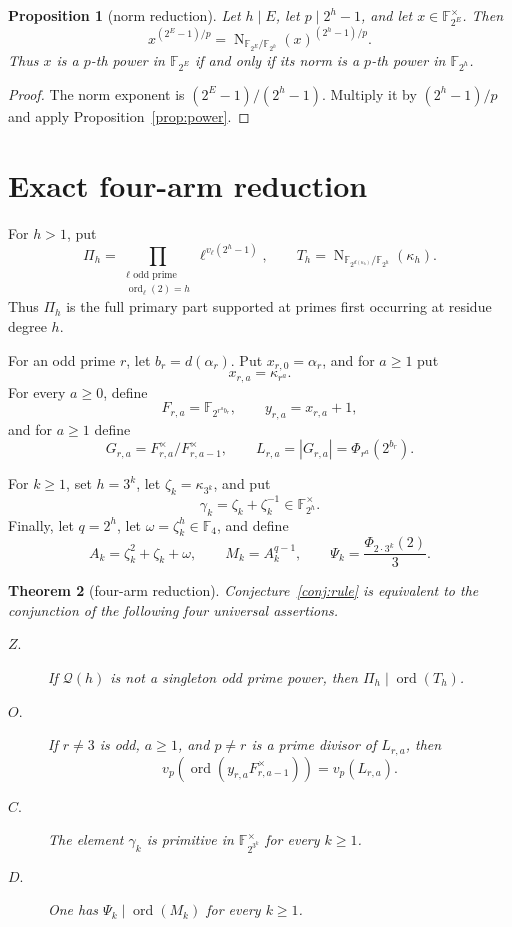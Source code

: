 \documentclass[11pt]{article}
\newtheorem{theorem}{Theorem}[section]
\newtheorem{proposition}[theorem]{Proposition}
\theoremstyle{definition}
\theoremstyle{remark}
\begin{document}
\begin{proposition}[norm reduction]\label{prop:norm}
Let $h\mid E$, let $p\mid2^h-1$, and let
$x\in\mathbb F_{2^E}^{\times}$.  Then
\[
 x^{(2^E-1)/p}
 =\operatorname N_{\mathbb F_{2^E}/\mathbb F_{2^h}}(x)^{(2^h-1)/p}.
\]
Thus $x$ is a $p$-th power in $\mathbb F_{2^E}$ if and only if its norm is
a $p$-th power in $\mathbb F_{2^h}$.
\end{proposition}

\begin{proof}
The norm exponent is $(2^E-1)/(2^h-1)$.  Multiply it by
$(2^h-1)/p$ and apply Proposition~\ref{prop:power}.
\end{proof}

\section{Exact four-arm reduction}\label{sec:arms}

For $h>1$, put
\[
 \Pi_h=
 \prod_{\substack{\ell\text{ odd prime}\\
                    \operatorname{ord}_{\ell}(2)=h}}
 \ell^{v_{\ell}(2^h-1)},
 \qquad
 T_h=\operatorname N_{\mathbb F_{2^{d(\kappa_h)}}/
                            \mathbb F_{2^h}}(\kappa_h).
\]
Thus $\Pi_h$ is the full primary part supported at primes first occurring at
residue degree $h$.

For an odd prime $r$, let $b_r=d(\alpha_r)$.  Put
$x_{r,0}=\alpha_r$, and for $a\geq1$ put
\[
 x_{r,a}=\kappa_{r^a}.
\]
For every $a\geq0$, define
\[
 F_{r,a}=\mathbb F_{2^{r^ab_r}},\qquad
 y_{r,a}=x_{r,a}+1,
\]
and for $a\geq1$ define
\[
 G_{r,a}=F_{r,a}^{\times}/F_{r,a-1}^{\times},
 \qquad
 L_{r,a}=|G_{r,a}|=\Phi_{r^a}(2^{b_r}).
\]

For $k\geq1$, set $h=3^k$, let $\zeta_k=\kappa_{3^k}$, and put
\[
 \gamma_k=\zeta_k+\zeta_k^{-1}\in\mathbb F_{2^h}^{\times}.
\]
Finally, let $q=2^h$, let $\omega=\zeta_k^h\in\mathbb F_4$, and define
\[
 A_k=\zeta_k^2+\zeta_k+\omega,
 \qquad M_k=A_k^{q-1},
 \qquad \Psi_k=\frac{\Phi_{2\cdot3^k}(2)}3.
\]

\begin{theorem}[four-arm reduction]\label{thm:arms}
Conjecture~\ref{conj:rule} is equivalent to the conjunction of the following
four universal assertions.
\begin{description}
\item[$Z$.] If $\mathcal Q(h)$ is not a singleton odd prime power, then
      $\Pi_h\mid\operatorname{ord}(T_h)$.
\item[$O$.] If $r\ne3$ is odd, $a\geq1$, and $p\ne r$ is a prime
      divisor of $L_{r,a}$, then
      \[
      v_p\!\left(\operatorname{ord}
       (y_{r,a}F_{r,a-1}^{\times})\right)=v_p(L_{r,a}).
      \]
\item[$C$.] The element $\gamma_k$ is primitive in
      $\mathbb F_{2^{3^k}}^{\times}$ for every $k\geq1$.
\item[$D$.] One has
      $\Psi_k\mid\operatorname{ord}(M_k)$ for every $k\geq1$.
\end{description}
\end{theorem}
\end{document}

